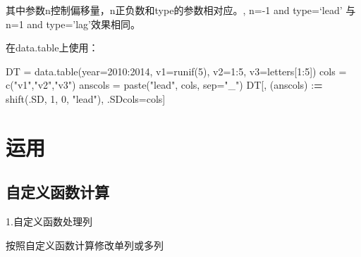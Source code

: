 \documentclass[
]{book}
\newenvironment{Shaded}{\begin{snugshade}}{\end{snugshade}}
\newcommand{\AttributeTok}[1]{\textcolor[rgb]{0.77,0.63,0.00}{#1}}
\newcommand{\DecValTok}[1]{\textcolor[rgb]{0.00,0.00,0.81}{#1}}
\newcommand{\ErrorTok}[1]{\textcolor[rgb]{0.64,0.00,0.00}{\textbf{#1}}}
\newcommand{\FunctionTok}[1]{\textcolor[rgb]{0.00,0.00,0.00}{#1}}
\newcommand{\NormalTok}[1]{#1}
\newcommand{\OtherTok}[1]{\textcolor[rgb]{0.56,0.35,0.01}{#1}}
\newcommand{\SpecialCharTok}[1]{\textcolor[rgb]{0.00,0.00,0.00}{#1}}
\newcommand{\StringTok}[1]{\textcolor[rgb]{0.31,0.60,0.02}{#1}}
\begin{document}
其中参数n控制偏移量，n正负数和type的参数相对应。, n=-1 and type=`lead' 与 n=1 and type='lag'效果相同。

在data.table上使用：

\begin{Shaded}
\begin{Highlighting}[]
\NormalTok{DT }\OtherTok{=} \FunctionTok{data.table}\NormalTok{(}\AttributeTok{year=}\DecValTok{2010}\SpecialCharTok{:}\DecValTok{2014}\NormalTok{, }\AttributeTok{v1=}\FunctionTok{runif}\NormalTok{(}\DecValTok{5}\NormalTok{), }\AttributeTok{v2=}\DecValTok{1}\SpecialCharTok{:}\DecValTok{5}\NormalTok{, }\AttributeTok{v3=}\NormalTok{letters[}\DecValTok{1}\SpecialCharTok{:}\DecValTok{5}\NormalTok{])}
\NormalTok{cols }\OtherTok{=} \FunctionTok{c}\NormalTok{(}\StringTok{"v1"}\NormalTok{,}\StringTok{"v2"}\NormalTok{,}\StringTok{"v3"}\NormalTok{)}
\NormalTok{anscols }\OtherTok{=} \FunctionTok{paste}\NormalTok{(}\StringTok{"lead"}\NormalTok{, cols, }\AttributeTok{sep=}\StringTok{"\_"}\NormalTok{)}
\NormalTok{DT[, (anscols) }\SpecialCharTok{:}\ErrorTok{=} \FunctionTok{shift}\NormalTok{(.SD, }\DecValTok{1}\NormalTok{, }\DecValTok{0}\NormalTok{, }\StringTok{"lead"}\NormalTok{), .SDcols}\OtherTok{=}\NormalTok{cols]}
\end{Highlighting}
\end{Shaded}

\hypertarget{ux8fd0ux7528}{%
\section{运用}\label{ux8fd0ux7528}}

\hypertarget{ux81eaux5b9aux4e49ux51fdux6570ux8ba1ux7b97}{%
\subsection{自定义函数计算}\label{ux81eaux5b9aux4e49ux51fdux6570ux8ba1ux7b97}}

1.自定义函数处理列

按照自定义函数计算修改单列或多列
\end{document}

